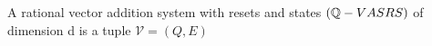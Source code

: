 
\begin{mydef}
A rational vector addition system with resets and states $(\mathbb{Q}-VASRS)$ of dimension d is a tuple $\mathcal{V} = (Q, E)$
\end{mydef}

